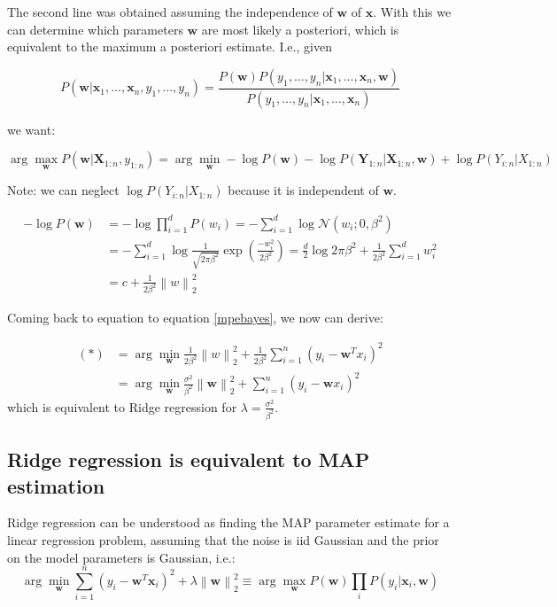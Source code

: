 \documentclass[a4paper,10pt,twoside]{article}
\newcommand\norm[1]{\left\lVert#1\right\rVert}
\begin{document}
The second line was obtained assuming the independence of $\mathbf{w}$ of $\mathbf{x}$. With this we can determine which parameters $\mathbf{w}$ are most likely a posteriori, which is equivalent to the maximum a posteriori estimate. I.e., given

\begin{equation*}
    P(\mathbf{w}|\mathbf{x}_1,\ldots, \mathbf{x}_n,y_1, \ldots, y_n) = \frac{P(\mathbf{w})P(y_1,\ldots,y_n|\mathbf{x}_1,\ldots,\mathbf{x}_n,\mathbf{w})}{P(y_1,\ldots,y_n|\mathbf{x}_1,\ldots, \mathbf{x}_n)}
\end{equation*}

we want:

\begin{equation}\label{mpebayes}
    \arg\max_{\mathbf{w}}P(\mathbf{w}|\mathbf{X}_{1:n},y_{1:n})=\arg\min_{\mathbf{w}}-\log P(\mathbf{w})-\log P(\mathbf{Y}_{1:n}|\mathbf{X}_{1:n},\mathbf{w}) + \log P(Y_{i:n}|X_{1:n})
\end{equation}

Note: we can neglect $\log P(Y_{i:n}|X_{1:n})$ because it is independent of $\mathbf{w}$.

\begin{align*}
    -\log P(\mathbf{w}) &= -\log \prod_{i=1}^d P(w_i) = -\sum_{i=1}^{d}\log\mathcal{N}(w_i;0,\beta^2)\\
    &=-\sum_{i=1}^{d}\log\frac{1}{\sqrt{2\pi\beta^2}}\exp(\frac{-w_i^2}{2\beta^2})=\frac{d}{2}\log 2\pi\beta^2+\frac{1}{2\beta^2}\sum_{i=1}^{d}w_i^2\\
    &=c+\frac{1}{2\beta^2}\norm{w}_2^2
\end{align*}

Coming back to equation to equation \ref{mpebayes}, we now can derive:

\begin{align*}
    (*) &= \arg\min_{\mathbf{w}}\frac{1}{2\beta^2}\norm{w}_2^2 + \frac{1}{2\beta^2}\sum_{i=1}^{n}(y_i-\mathbf{w}^Tx_i)^2\\
    &=\arg\min_{\mathbf{w}}\frac{\sigma^2}{\beta^2}\norm{\mathbf{w}}_2^2+\sum_{i=1}^{n}(y_i-\mathbf{w}x_i)^2
\end{align*}
which is equivalent to Ridge regression for $\lambda=\frac{\sigma^2}{\beta^2}$.

\subsection{Ridge regression is equivalent to MAP estimation}

Ridge regression can be understood as finding the MAP parameter estimate for a linear regression problem, assuming that the noise is iid Gaussian and the prior on the model parameters is Gaussian, i.e.:
\begin{equation*}
    \arg\min_{\mathbf{w}}\sum_{i=1}^{n}(y_i-\mathbf{w}^T\mathbf{x}_i)^2+\lambda\norm{\mathbf{w}}_2^2\equiv\arg\max_{\mathbf{w}}P(\mathbf{w})\prod_{i}P(y_i|\mathbf{x}_i,\mathbf{w})
\end{equation*}
\end{document}

